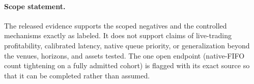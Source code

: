 \paragraph{Scope statement.} The released evidence supports the scoped negatives and the
controlled mechanisms exactly as labeled. It does not support claims of live-trading
profitability, calibrated latency, native queue priority, or generalization beyond the venues,
horizons, and assets tested. The one open endpoint (native-FIFO count tightening on a fully
admitted cohort) is flagged with its exact source so that it can be completed rather than
assumed.
